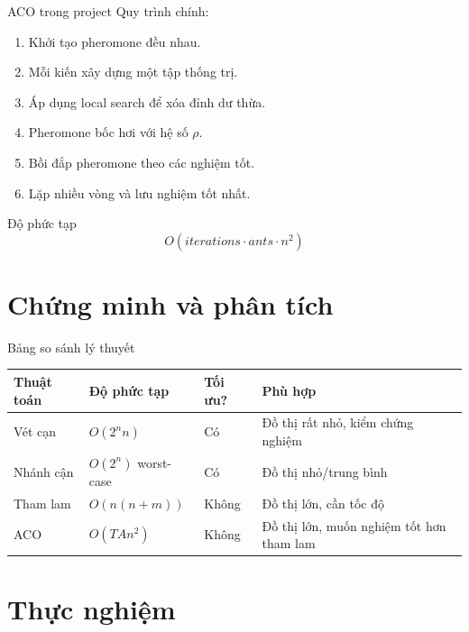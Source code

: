 \documentclass[aspectratio=169, 11pt]{beamer}
\begin{document}
\begin{frame}{ACO trong project}
  Quy trình chính:
  \begin{enumerate}
    \item Khởi tạo pheromone đều nhau.
    \item Mỗi kiến xây dựng một tập thống trị.
    \item Áp dụng local search để xóa đỉnh dư thừa.
    \item Pheromone bốc hơi với hệ số $\rho$.
    \item Bồi đắp pheromone theo các nghiệm tốt.
    \item Lặp nhiều vòng và lưu nghiệm tốt nhất.
  \end{enumerate}

  \begin{block}{Độ phức tạp}
    \[
      O(iterations \cdot ants \cdot n^2)
    \]
  \end{block}
\end{frame}

\section{Chứng minh và phân tích}





\begin{frame}{Bảng so sánh lý thuyết}
  \begin{table}
    \centering
    \small
    \begin{tabular}{p{2.7cm} p{3.2cm} p{2.2cm} p{4.0cm}}
      \toprule
      \textbf{Thuật toán} & \textbf{Độ phức tạp} & \textbf{Tối ưu?} & \textbf{Phù hợp} \\
      \midrule
      Vét cạn & $O(2^n n)$ & Có & Đồ thị rất nhỏ, kiểm chứng nghiệm \\
      Nhánh cận & $O(2^n)$ worst-case & Có & Đồ thị nhỏ/trung bình \\
      Tham lam & $O(n(n+m))$ & Không & Đồ thị lớn, cần tốc độ \\
      ACO & $O(TAn^2)$ & Không & Đồ thị lớn, muốn nghiệm tốt hơn tham lam \\
      \bottomrule
    \end{tabular}
  \end{table}
\end{frame}

\section{Thực nghiệm}
\end{document}
